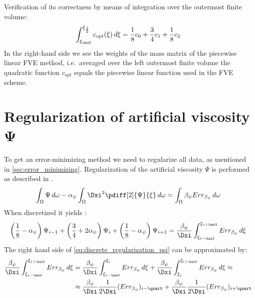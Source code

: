 Verification of its correctness by means of integration over the outermost finite volume:
\begin{align}
\int_{\xi_{\half}}^{\xi_{\frac{3}{2}}} c_{opt}(\xi)\, d\xi = \frac{1}{8} c_0 + \frac{3}{4} c_1 + \frac{1}{8} c_2
\end{align}
In the right-hand side we see the weights of the mass matrix of the piecewise linear FVE
method, i.e.\ averaged over the left outermost finite volume the quadratic function $c_{opt}$
equals the piecewise linear function used in the FVE scheme.
\section{Regularization of artificial viscosity $\mathbf{\Psi}$}\label{sec:regularization_artificial_viscosity}
To get an error-minimizing method we need to regularize all data, as mentioned in \autoref{sec:error_minimizing}.
Regularization of the artificial viscosity $\Psi$ is performed as described in \citet[eq.\ 14]{Borsboom2001}.
\begin{align}
    \int_\Omega \Psi\, d\omega - \alpha_{\psi} \int_\Omega \Dxi^2 \pdiff[2]{\Psi}{\xi}\, d\omega = \int_\Omega \beta_{\psi} Err_{\beta_{\psi}}\, d\omega
\end{align}
When discretized it yields \citep[eq.\ 18]{Borsboom2001}:
\begin{align}
    \left(\frac{1}{8} - \alpha_{\psi} \right)\Psi_{i-1} +
    \left(\frac{3}{4} + 2\alpha_{\psi} \right)\Psi_{i} +
    \left(\frac{1}{8} - \alpha_{\psi} \right)\Psi_{i+1} = \frac{\beta_{\psi}}{\Dxi} \int^{\xi_{i+\half}}_{\xi_{i-\half}} Err_{\beta_{\psi}}\, d\xi
    \label{eq:discrete_regularization_psi}
\end{align}
%
The right hand side of \autoref{eq:discrete_regularization_psi} can be approximated by:
\begin{align}
    \frac{\beta_{\psi}}{\Dxi} \int^{\xi_{i+\half}}_{\xi_{i-\half}} Err_{\beta_{\psi}}\, d\xi
& =
    \frac{\beta_{\psi}}{\Dxi} \int^{\xi_{i}}_{\xi_{i-\half}} Err_{\beta_{\psi}}\, d\xi
    + \frac{\beta_{\psi}}{\Dxi} \int^{\xi_{i+\half}}_{\xi_{i}} Err_{\beta_{\psi}}\, d\xi \approx
    \\*
    &\approx \frac{\beta_{\psi}}{\Dxi} \frac{1}{2\Dxi} (Err_{\beta_{\psi}})_{i-\quart}
  + \frac{\beta_{\psi}}{\Dxi} \frac{1}{2\Dxi} (Err_{\beta_{\psi}})_{i+\quart}
\end{align}
